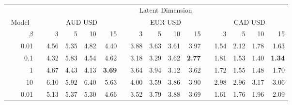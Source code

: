 \documentclass[onefignum,onetabnum]{siamonline190516}
\begin{document}
\begin{table}[htbp]
\tiny
\renewcommand{\arraystretch}{0.95}

  \centering
    \begin{tabular}{rcrcrrrrrrrrrrrrrr}
    \addlinespace
    \toprule
          &       &       &       & \multicolumn{ 14}{c}{Latent Dimension}                                                                       \\
          
    \cmidrule(lr){4-18}
    \multicolumn{3}{c}{Model}              &       & \multicolumn{ 4}{c}{AUD-USD}  &       & \multicolumn{ 4}{c}{EUR-USD}  &       & \multicolumn{ 4}{c}{CAD-USD}  
    \\
    \cmidrule(lr){1-3}
    \cmidrule(lr){5-8}
    \cmidrule(lr){10-13}
    \cmidrule(lr){15-18}
    & & $\beta$      &       & 3     & 5     & 10    & 15    &       & 3     & 5     & 10    & 15    &       & 3     & 5     & 10    & 15 
          \\
    \cmidrule(lr){3-0}
    \cmidrule(lr){5-8}
    \cmidrule(lr){10-13}
    \cmidrule(lr){15-18}
    \parbox[t]{2mm}{}   & \parbox[t]{2mm}{}  
                  & 0.01  &       &        4.56  &        5.35  &        4.82  &        4.40  &       &        3.88  &        3.63  &        3.61  &        3.97  &       &        1.54  &        2.12  &        1.78  &        1.63  \\
          &       & 0.1   &       &        4.32  &        5.83  &        4.54  &        4.62  &       &        3.18  &        3.29  &        3.62  &        \bf{2.77}  &       &        1.81  &        1.53  &        1.40  &        \bf{1.34}  \\
          &       & 1     &       &        4.67  &        4.43  &        4.13  &        \bf{3.69}  &       &        3.64  &        3.94  &        3.12  &        3.62  &       &        1.72  &        1.55  &        1.48  &        1.70  \\
          &       & 10    &       &        6.10  &        5.92  &        6.40  &        5.63  &       &        4.00  &        3.59  &        3.86  &        3.90  &       &        2.98  &        2.96  &        3.17  &        3.06  \\
\cmidrule(lr){2-18}
          & \parbox[t]{2mm}{}    
                  & 0.01  &       &        5.13  &        5.37  &        5.30  &        4.66  &       &        3.52  &        3.79  &        3.88  &        3.69  &       &        1.61  &        1.76  &        1.96  &        2.09  \\

\end{tabular}
\end{table}
\end{document}
